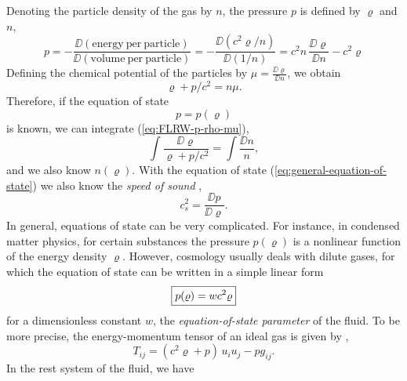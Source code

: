 Denoting the particle density of the gas by $n$, the pressure $p$ is defined by $\varrho$ and $n$, \cite[83,233-234]{Stephani-1991}
\begin{equation*}
	p
	= - \frac{\DD (\mathrm{energy\ per\ particle})}{\DD (\mathrm{volume\ per\ particle})}
	= - \frac{\DD (c^2 \varrho/n)}{\DD (1/n)}
	= c^2 n \, \frac{\DD \varrho}{\DD n} - c^2 \varrho
\end{equation*}
Defining the chemical potential of the particles by $\mu = \frac{\DD \varrho}{\DD n}$, we obtain
\begin{equation}
	\varrho + p/c^2 = n \mu
	.
	\label{eq:FLRW-p-rho-mu}
\end{equation}
Therefore, if the equation of state
\begin{equation}
	p = p(\varrho)
	\label{eq:general-equation-of-state}
\end{equation}
is known, we can integrate (\ref{eq:FLRW-p-rho-mu}),
\begin{equation}
	\int \frac{\DD \varrho}{\varrho + p/c^2}
	= \int \frac{\DD n}{n}
	,
\end{equation}
and we also know $n(\varrho)$.
\cite[137]{Sexl-Urbantke-1987}
With the equation of state (\ref{eq:general-equation-of-state}) we also know the \emph{speed of sound} \cite[193]{Dodelson-Schmidt-2025}, \cite[210]{Ryden-2017}
\begin{equation}
	c_s^2 = \frac{\DD p}{\DD \varrho}.
	\label{eq:speed-of-sound}
\end{equation}
In general, equations of state can be very complicated. For instance, in condensed matter physics, for certain substances the pressure $p(\varrho)$ is a nonlinear function of the energy density $\varrho$. However, cosmology usually deals with dilute gases, for which the equation of state can be written in a simple linear form
\begin{equation}
	\fbox{$\displaystyle
	p(\varrho) = w c^2 \varrho
	$}
	\label{eq:FLRW-equation-of-state}
\end{equation}
for a dimensionless constant $w$, the \emph{equation-of-state parameter} of the fluid.
To be more precise, the energy-momentum tensor of an ideal gas is given by \cite[103]{Landau-Lifschitz-1997}, \cite[134]{Sexl-Urbantke-1987}
\begin{equation}
	T_{ij}
	= (c^2\varrho + p) \, u_i u_j - p g_{ij}
	.
\end{equation}
In the rest system of the fluid, we have
